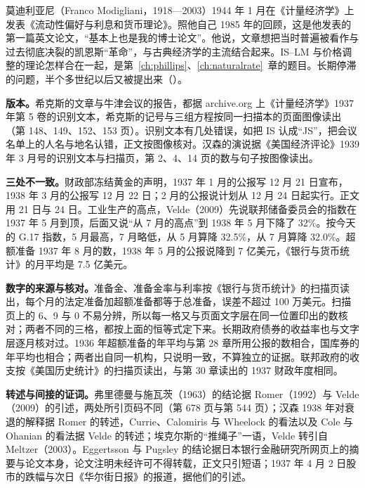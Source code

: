 莫迪利亚尼（Franco Modigliani，1918—2003）1944 年 1 月在《计量经济学》上发表《流动性偏好与利息和货币理论》\cite{modigliani1944,loc33}。照他自己 1985 年的回顾，这是他发表的第一篇英文论文，“基本上也是我的博士论文”\cite{nobel1985}。他说，文章想把当时普遍被看作与过去彻底决裂的凯恩斯“革命”，与古典经济学的主流结合起来\cite{nobel1985}。IS–LM 与价格调整的理论怎样合在一起，是第~\ref{ch:phillips}、\ref{ch:naturalrate}~章的题目。长期停滞的问题，半个多世纪以后又被提出来（）。

\begin{deeper}[史料说明]
\textbf{版本。}希克斯的文章与牛津会议的报告，都据 archive.org 上《计量经济学》1937 年第 5 卷的识别文本，希克斯的记号与三组方程按同一扫描本的页面图像读出（第 148、149、152、153 页）。识别文本有几处错误，如把 IS 认成“JS”，把会议名单上的人名与地名认错，正文按图像核对。汉森的演说据《美国经济评论》1939 年 3 月号的识别文本与扫描页，第 2、4、14 页的数与句子按图像读出。

\textbf{三处不一致。}财政部冻结黄金的声明，1937 年 1 月的公报写 12 月 21 日宣布，1938 年 3 月的公报写 12 月 22 日；2 月的公报说计划从 12 月 24 日起实行。正文用 21 日与 24 日。工业生产的高点，Velde（2009）先说联邦储备委员会的指数在 1937 年 5 月到顶，后面又说“从 7 月的高点”到 1938 年 5 月下降了 32\%。按今天的 G.17 指数，5 月最高，7 月略低，从 5 月算降 32.5\%，从 7 月算降 32.0\%。超额准备 1937 年 8 月的数，1938 年 5 月的公报说降到 7 亿美元，《银行与货币统计》的月平均是 7.5 亿美元。

\textbf{数字的来源与核对。}准备金、准备金率与利率按《银行与货币统计》的扫描页读出，每个月的法定准备加超额准备都等于总准备，误差不超过 100 万美元。扫描页上的 6、9 与 0 不易分辨，所以每一格又与页面文字层在同一位置印出的数核对；两者不同的三格，都按上面的恒等式定下来。长期政府债券的收益率也与文字层逐月核对过。1936 年超额准备的年平均与第 28 章所用公报的数相合，国库券的年平均也相合；两者出自同一机构，只说明一致，不算独立的证据。联邦政府的收支按《美国历史统计》的扫描页读出，与第 30 章读出的 1937 财政年度相同。

\textbf{转述与间接的证词。}弗里德曼与施瓦茨（1963）的结论据 Romer（1992）与 Velde（2009）的引述，两处所引页码不同（第 678 页与第 544 页）；汉森 1938 年对衰退的解释据 Romer 的转述，Currie、Calomiris 与 Wheelock 的看法以及 Cole 与 Ohanian 的看法据 Velde 的转述；埃克尔斯的“推绳子”一语，Velde 转引自 Meltzer（2003）。Eggertsson 与 Pugsley 的结论据日本银行金融研究所网页上的摘要与论文本身，论文注明未经许可不得转载，正文只引短语；1937 年 4 月 2 日股市的跌幅与次日《华尔街日报》的报道，据他们的引述。


\end{deeper}
